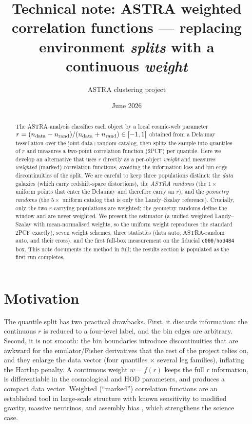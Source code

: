 \documentclass[11pt]{article}
\title{Technical note: ASTRA weighted correlation functions ---
replacing environment \emph{splits} with a continuous \emph{weight}}
\author{ASTRA clustering project}
\date{June 2026}
\newcommand{\code}[1]{\texttt{#1}}
\newcommand{\rpar}{r}
\begin{document}
\maketitle

\begin{abstract}
The ASTRA analysis classifies each object by a local cosmic-web parameter
$\rpar=(n_{\rm data}-n_{\rm rand})/(n_{\rm data}+n_{\rm rand})\in[-1,1]$ obtained
from a Delaunay tessellation over the joint data$+$random catalog, then splits the
sample into quantiles of $\rpar$ and measures a two-point correlation function
(2PCF) per quantile.  Here we develop an alternative that uses $\rpar$ directly as
a per-object \emph{weight} and measures \emph{weighted} (marked) correlation
functions, avoiding the information loss and bin-edge discontinuities of the
split.  We are careful to keep three populations distinct: the \emph{data}
galaxies (which carry redshift-space distortions), the \emph{ASTRA randoms} (the
$1\times$ uniform points that enter the Delaunay and therefore carry an $\rpar$),
and the \emph{geometry randoms} (the $5\times$ uniform catalog that is only the
Landy--Szalay reference).  Crucially, only the two $\rpar$-carrying populations are
weighted; the geometry randoms define the window and are never weighted.  We
present the estimator (a unified weighted Landy--Szalay with mean-normalised
weights, so the uniform weight reproduces the standard 2PCF exactly), seven weight
schemes, three statistics (data auto, ASTRA-random auto, and their cross), and the
first full-box measurement on the fiducial \code{c000}/\code{hod484} box.  This
note documents the method in full; the results section is populated as the first
run completes.
\end{abstract}

\section{Motivation}
The quantile split has two practical drawbacks.  First, it discards information:
the continuous $\rpar$ is reduced to a four-level label, and the bin edges are
arbitrary.  Second, it is not smooth: the bin boundaries introduce discontinuities
that are awkward for the emulator/Fisher derivatives that the rest of the project
relies on, and they enlarge the data vector (four quantiles $\times$ several leg
families), inflating the Hartlap penalty.  A continuous weight $w=f(\rpar)$ keeps
the full $\rpar$ information, is differentiable in the cosmological and HOD
parameters, and produces a compact data vector.  Weighted (``marked'')
correlation functions are an established tool in large-scale structure with known
sensitivity to modified gravity, massive neutrinos, and assembly bias
\cite{Sheth2005,White2016,Massara2021}, which strengthens the science case.
\end{document}
